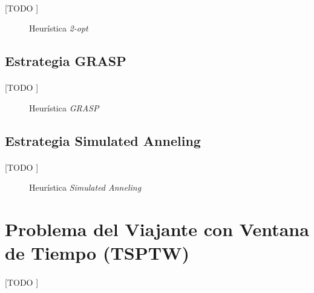 \documentclass[spanish]{article}
\begin{document}
			\paragraph{}
			[TODO ]

			\begin{figure}
	      \centering
	      \caption{Heurística \emph{2-opt}}
	      \label{code:tsp-2-opt}
	    \end{figure}

		\subsection{Estrategia GRASP}

			\paragraph{}
			[TODO ]

			\begin{figure}
				\centering
				\caption{Heurística \emph{GRASP}}
				\label{code:tsp-grasp}
			\end{figure}

		\subsection{Estrategia Simulated Anneling}

			\paragraph{}
			[TODO ]

			\begin{figure}
	      \centering
				\caption{Heurística \emph{Simulated Anneling}}
	      \label{code:tsp-simulated-anneling}
	    \end{figure}

	\section{Problema del Viajante con Ventana de Tiempo (TSPTW)}

		\paragraph{}
		[TODO ]
\end{document}
